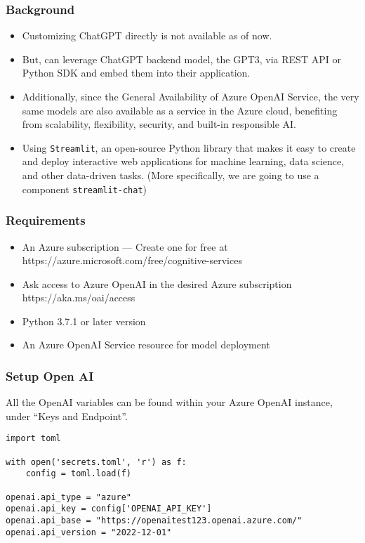 \begin{frame}[fragile]\frametitle{ Background}


\begin{itemize}
\item Customizing ChatGPT directly is not available as of now.
\item But, can leverage ChatGPT backend model, the GPT3, via REST API or Python SDK and embed them into their application.
\item Additionally, since the General Availability of Azure OpenAI Service, the very same models are also available as a service in the Azure cloud, benefiting from scalability, flexibility, security, and built-in responsible AI.
\item Using  \lstinline|Streamlit|, an open-source Python library that makes it easy to create and deploy interactive web applications for machine learning, data science, and other data-driven tasks. (More specifically, we are going to use a component \lstinline|streamlit-chat|)
\end{itemize}	 

\end{frame}

\begin{frame}[fragile]\frametitle{ Requirements}

\begin{itemize}
\item An Azure subscription — Create one for free at https://azure.microsoft.com/free/cognitive-services
\item Ask access to Azure OpenAI in the desired Azure subscription https://aka.ms/oai/access
\item Python 3.7.1 or later version
\item An Azure OpenAI Service resource for model deployment
\end{itemize}	 

\end{frame}

\begin{frame}[fragile]\frametitle{ Setup Open AI}

All the OpenAI variables can be found within your Azure OpenAI instance, under ``Keys and Endpoint''.

\begin{lstlisting}
import toml

with open('secrets.toml', 'r') as f:
    config = toml.load(f)

openai.api_type = "azure"
openai.api_key = config['OPENAI_API_KEY']
openai.api_base = "https://openaitest123.openai.azure.com/"
openai.api_version = "2022-12-01"

\end{lstlisting}	 


\end{frame}

